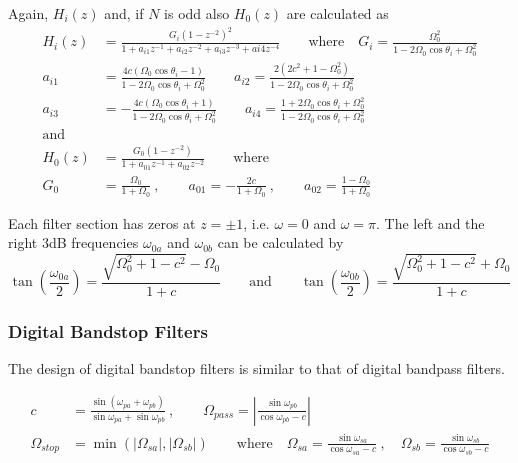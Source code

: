 Again, $H_i(z)$ and, if $N$ is odd also $H_0(z)$ are calculated as
\begin{align*}
	H_i(z) &= \frac{G_i (1-z^{-2})^2}{1 + a_{i1}z^{-1} + a_{i2}z^{-2} + a_{i3}z^{-3} + a{i4}z^{-4}}
	\qquad \text{where} \quad
	G_i = \frac{\Omega_0^2}{1-2\Omega_0\cos\theta_i+\Omega_0^2} \\
	a_{i1} &= \frac{4c(\Omega_0\cos\theta_i-1)}{1-2\Omega_0\cos\theta_i+\Omega_0^2} \qquad
	a_{i2} = \frac{2(2c^2+1-\Omega_0^2)}{1-2\Omega_0\cos\theta_i+\Omega_0^2} \\
	a_{i3} &= -\frac{4c(\Omega_0\cos\theta_i+1)}{1-2\Omega_0\cos\theta_i+\Omega_0^2} \qquad
	a_{i4} = \frac{1+2\Omega_0\cos\theta_i+\Omega_0^2}{1-2\Omega_0\cos\theta_i+\Omega_0^2} \\
	\text{and} \\
	H_0(z) &= \frac{G_0(1-z^{-2})}{1+a_{01}z^{-1}+a_{02}z^{-2}} \qquad \text{where} \\
	G_0 &= \frac{\Omega_0}{1+\Omega_0} \:,\qquad
	a_{01} = -\frac{2c}{1+\Omega_0} \:,\qquad
	a_{02} = \frac{1-\Omega_0}{1+\Omega_0}
\end{align*}

Each filter section has zeros at $z=\pm 1$, i.e. $\omega=0$ and $\omega=\pi$.
The left and the right 3dB frequencies $\omega_{0a}$ and $\omega_{0b}$ can be
calculated by
\begin{equation*}
	\tan\left(\frac{\omega_{0a}}{2}\right) = \frac{\sqrt{\Omega_0^2+1-c^2}-\Omega_0}{1+c}
	\qquad \text{and} \qquad
	\tan\left(\frac{\omega_{0b}}{2}\right) = \frac{\sqrt{\Omega_0^2+1-c^2}+\Omega_0}{1+c}
\end{equation*}

\subsubsection{Digital Bandstop Filters}
The design of digital bandstop filters is similar to that of digital
bandpass filters.

\begin{align*}
	c &= \frac{\sin(\omega_{pa}+\omega_{pb})}{\sin\omega_{pa}+\sin\omega_{pb}}
	\:,\qquad
	\Omega_{pass} = \left| \frac{\sin\omega_{pb}}{\cos\omega_{pb}-c} \right| \\
	\Omega_{stop} &= \min\left(|\Omega_{sa}|,|\Omega_{sb}|\right)
	\qquad \text{where} \quad
	\Omega_{sa} = \frac{\sin\omega_{sa}}{\cos\omega_{sa}-c}\:,\quad
	\Omega_{sb} = \frac{\sin\omega_{sb}}{\cos\omega_{sb}-c}
\end{align*}

